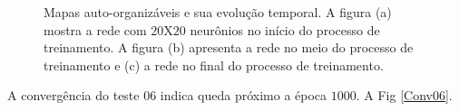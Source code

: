 \begin{figure}[H]
	\centering
	\qquad
	\qquad
	\qquad
	\caption{Mapas auto-organizáveis e sua evolução temporal. A figura (a) mostra a rede com $20$X$20$ neurônios no início do processo de treinamento. A figura (b) apresenta a rede no meio do processo de treinamento e (c) a rede no final do processo de treinamento.}
	\label{SOMt06}
\end{figure}

A convergência do teste $06$ indica queda próximo a época $1000$. A Fig \ref{Conv06}. 

